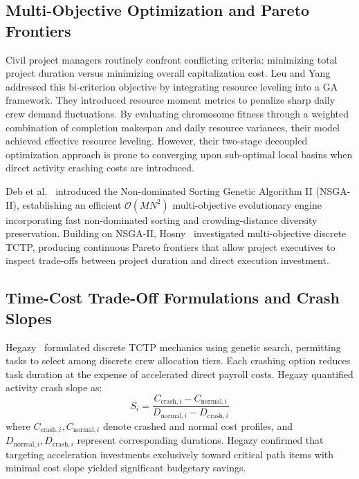 \documentclass[conference]{IEEEtran}
\begin{document}
\subsection{Multi-Objective Optimization and Pareto Frontiers}
Civil project managers routinely confront conflicting criteria: minimizing total project duration versus minimizing overall capitalization cost. Leu and Yang~\cite{leu1999multicriteria} addressed this bi-criterion objective by integrating resource leveling into a GA framework. They introduced resource moment metrics to penalize sharp daily crew demand fluctuations. By evaluating chromosome fitness through a weighted combination of completion makespan and daily resource variances, their model achieved effective resource leveling. However, their two-stage decoupled optimization approach is prone to converging upon sub-optimal local basins when direct activity crashing costs are introduced.

Deb et al.~\cite{deb2002fast} introduced the Non-dominated Sorting Genetic Algorithm II (NSGA-II), establishing an efficient $\mathcal{O}(M N^2)$ multi-objective evolutionary engine incorporating fast non-dominated sorting and crowding-distance diversity preservation. Building on NSGA-II, Hosny~\cite{hosny2019elitist} investigated multi-objective discrete TCTP, producing continuous Pareto frontiers that allow project executives to inspect trade-offs between project duration and direct execution investment.

\subsection{Time-Cost Trade-Off Formulations and Crash Slopes}
Hegazy~\cite{hegazy1999construction} formulated discrete TCTP mechanics using genetic search, permitting tasks to select among discrete crew allocation tiers. Each crashing option reduces task duration at the expense of accelerated direct payroll costs. Hegazy quantified activity crash slope as:
\begin{equation}
S_i = \frac{C_{\text{crash}, i} - C_{\text{normal}, i}}{D_{\text{normal}, i} - D_{\text{crash}, i}}
\end{equation}
where $C_{\text{crash}, i}, C_{\text{normal}, i}$ denote crashed and normal cost profiles, and $D_{\text{normal}, i}, D_{\text{crash}, i}$ represent corresponding durations. Hegazy confirmed that targeting acceleration investments exclusively toward critical path items with minimal cost slope yielded significant budgetary savings.
\end{document}

